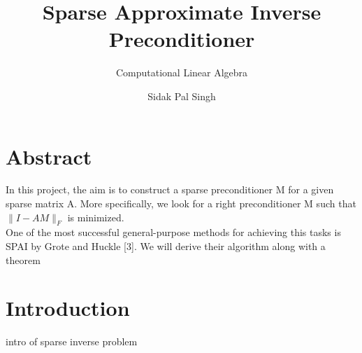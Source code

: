 \documentclass[paper=A4, fontsize=11pt]{scrartcl}
\title{Sparse Approximate Inverse Preconditioner}
\subtitle{Computational Linear Algebra}
\author{Sidak Pal Singh}
\theoremstyle{remark}
\begin{document}
	\maketitle
	
	\section{Abstract}
	
	In this project, the aim is to construct a sparse preconditioner M for a given sparse matrix A. More specifically, we look for a right preconditioner M such that $\|I-A M\|_{F}$ is minimized. \\
	One of the most successful general-purpose methods for achieving this tasks is SPAI by Grote and Huckle [3]. We will derive their algorithm along with a theorem 
	
	
	\section{Introduction}
	
	intro of sparse inverse problem
	
	\newpage
	
\end{document}
